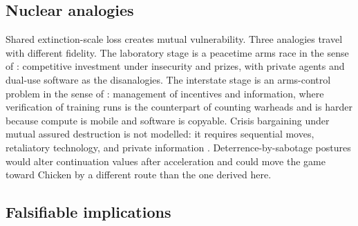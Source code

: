 \documentclass[11pt]{article}
\theoremstyle{plain}
\theoremstyle{definition}
\theoremstyle{remark}
\begin{document}
\subsection{Nuclear analogies}

Shared extinction-scale loss creates mutual vulnerability. Three analogies travel with different fidelity. The laboratory stage is a peacetime arms race in the sense of \citet{glaser1997}: competitive investment under insecurity and prizes, with private agents and dual-use software as the disanalogies. The interstate stage is an arms-control problem in the sense of \citet{schelling1961}: management of incentives and information, where verification of training runs is the counterpart of counting warheads and is harder because compute is mobile and software is copyable. Crisis bargaining under mutual assured destruction is not modelled: it requires sequential moves, retaliatory technology, and private information \citep{powell1987}. Deterrence-by-sabotage postures \citep{hendrycks2025} would alter continuation values after acceleration and could move the game toward Chicken by a different route than the one derived here.

\subsection{Falsifiable implications}
\end{document}
